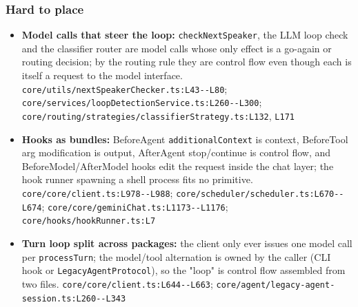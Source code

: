 
\subsubsection*{Hard to place}
\begin{itemize}
\item \textbf{Model calls that steer the loop:} \texttt{checkNextSpeaker}, the LLM loop check and the classifier router are model calls whose only effect is a go-again or routing decision; by the routing rule they are control flow even though each is itself a request to the model interface. \texttt{core/\allowbreak{}utils/\allowbreak{}nextSpeakerChecker.\allowbreak{}ts:\allowbreak{}L43-\allowbreak{}-\allowbreak{}L80}; \texttt{core/\allowbreak{}services/\allowbreak{}loopDetectionService.\allowbreak{}ts:\allowbreak{}L260-\allowbreak{}-\allowbreak{}L300}; \texttt{core/\allowbreak{}routing/\allowbreak{}strategies/\allowbreak{}classifierStrategy.\allowbreak{}ts:\allowbreak{}L132}, \texttt{L171}
\item \textbf{Hooks as bundles:} BeforeAgent \texttt{additionalContext} is context, BeforeTool arg modification is output, AfterAgent stop/continue is control flow, and BeforeModel/AfterModel hooks edit the request inside the chat layer; the hook runner spawning a shell process fits no primitive. \texttt{core/\allowbreak{}core/\allowbreak{}client.\allowbreak{}ts:\allowbreak{}L978-\allowbreak{}-\allowbreak{}L988}; \texttt{core/\allowbreak{}scheduler/\allowbreak{}scheduler.\allowbreak{}ts:\allowbreak{}L670-\allowbreak{}-\allowbreak{}L674}; \texttt{core/\allowbreak{}core/\allowbreak{}geminiChat.\allowbreak{}ts:\allowbreak{}L1173-\allowbreak{}-\allowbreak{}L1176}; \texttt{core/\allowbreak{}hooks/\allowbreak{}hookRunner.\allowbreak{}ts:\allowbreak{}L7}
\item \textbf{Turn loop split across packages:} the client only ever issues one model call per \texttt{processTurn}; the model/tool alternation is owned by the caller (CLI hook or \texttt{LegacyAgentProtocol}), so the "loop" is control flow assembled from two files. \texttt{core/\allowbreak{}core/\allowbreak{}client.\allowbreak{}ts:\allowbreak{}L644-\allowbreak{}-\allowbreak{}L663}; \texttt{core/\allowbreak{}agent/\allowbreak{}legacy-\allowbreak{}agent-\allowbreak{}session.\allowbreak{}ts:\allowbreak{}L260-\allowbreak{}-\allowbreak{}L343}
\end{itemize}

